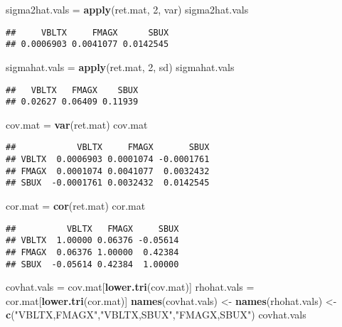 \documentclass[]{article}
\newenvironment{Shaded}{\begin{snugshade}}{\end{snugshade}}
\newcommand{\KeywordTok}[1]{\textcolor[rgb]{0.13,0.29,0.53}{\textbf{#1}}}
\newcommand{\DecValTok}[1]{\textcolor[rgb]{0.00,0.00,0.81}{#1}}
\newcommand{\StringTok}[1]{\textcolor[rgb]{0.31,0.60,0.02}{#1}}
\newcommand{\NormalTok}[1]{#1}
\begin{document}
\begin{Shaded}
\begin{Highlighting}[]
\NormalTok{sigma2hat.vals =}\StringTok{ }\KeywordTok{apply}\NormalTok{(ret.mat, }\DecValTok{2}\NormalTok{, var)}
\NormalTok{sigma2hat.vals}
\end{Highlighting}
\end{Shaded}

\begin{verbatim}
##     VBLTX     FMAGX      SBUX 
## 0.0006903 0.0041077 0.0142545
\end{verbatim}

\begin{Shaded}
\begin{Highlighting}[]
\NormalTok{sigmahat.vals =}\StringTok{ }\KeywordTok{apply}\NormalTok{(ret.mat, }\DecValTok{2}\NormalTok{, sd)}
\NormalTok{sigmahat.vals}
\end{Highlighting}
\end{Shaded}

\begin{verbatim}
##   VBLTX   FMAGX    SBUX 
## 0.02627 0.06409 0.11939
\end{verbatim}

\begin{Shaded}
\begin{Highlighting}[]
\NormalTok{cov.mat =}\StringTok{ }\KeywordTok{var}\NormalTok{(ret.mat)}
\NormalTok{cov.mat}
\end{Highlighting}
\end{Shaded}

\begin{verbatim}
##            VBLTX     FMAGX       SBUX
## VBLTX  0.0006903 0.0001074 -0.0001761
## FMAGX  0.0001074 0.0041077  0.0032432
## SBUX  -0.0001761 0.0032432  0.0142545
\end{verbatim}

\begin{Shaded}
\begin{Highlighting}[]
\NormalTok{cor.mat =}\StringTok{ }\KeywordTok{cor}\NormalTok{(ret.mat)}
\NormalTok{cor.mat}
\end{Highlighting}
\end{Shaded}

\begin{verbatim}
##          VBLTX   FMAGX     SBUX
## VBLTX  1.00000 0.06376 -0.05614
## FMAGX  0.06376 1.00000  0.42384
## SBUX  -0.05614 0.42384  1.00000
\end{verbatim}

\begin{Shaded}
\begin{Highlighting}[]
\NormalTok{covhat.vals =}\StringTok{ }\NormalTok{cov.mat[}\KeywordTok{lower.tri}\NormalTok{(cov.mat)]}
\NormalTok{rhohat.vals =}\StringTok{ }\NormalTok{cor.mat[}\KeywordTok{lower.tri}\NormalTok{(cor.mat)]}
\KeywordTok{names}\NormalTok{(covhat.vals) <-}\StringTok{ }\KeywordTok{names}\NormalTok{(rhohat.vals) <-}\StringTok{ }
\KeywordTok{c}\NormalTok{(}\StringTok{"VBLTX,FMAGX"}\NormalTok{,}\StringTok{"VBLTX,SBUX"}\NormalTok{,}\StringTok{"FMAGX,SBUX"}\NormalTok{)}
\NormalTok{covhat.vals}
\end{Highlighting}
\end{Shaded}
\end{document}
